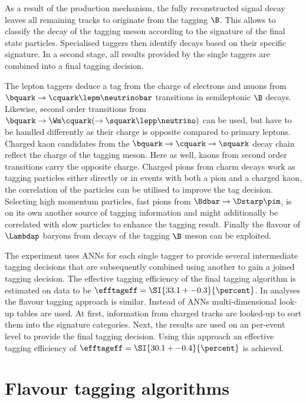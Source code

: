 As a result of the production mechanism, the fully reconstructed signal decay
leaves all remaining tracks to originate from the tagging $\B$. This allows to
classify the decay of the tagging meson according to the signature of the final
state particles. Specialised taggers then identify decays based on their
specific signature. In a second stage, all results provided by the single
taggers are combined into a final tagging decision. 

The lepton taggers deduce a tag from the charge of electrons and muons from
$\bquark \to \cquark \lepm \neutrinobar$ transitions in semileptonic $\B$
decays. Likewise, second order transitions from $\bquark \to \Wm \cquark ( \to
\squark \lepp \neutrino )$ can be used, but have to be handled differently as
their charge is opposite compared to primary leptons. Charged kaon candidates
from the $\bquark \to \cquark \to \squark$ decay chain reflect the charge of the
tagging meson. Here as well, kaons from second order transitions carry the
opposite charge. Charged pions from charm decays work as tagging particles
either directly or in events with both a pion and a charged kaon, the
correlation of the particles can be utilised to improve the tag decision.
Selecting high momentum particles, \eg fast pions from $\Bdbar \to \Dstarp
\pim$, is on its own another source of tagging information and might
additionally be correlated with slow particles to enhance the tagging result.
Finally the flavour of $\Lambdap$ baryons from decays of the tagging $\B$ meson
can be exploited.

The \Babar experiment uses \acp{ANN} for each single tagger to provide several
intermediate tagging decisions that are subsequently combined using another \ANN
to gain a joined tagging decision. The effective tagging efficiency of the final
\Babar tagging algorithm is estimated on data to be $\efftageff = \SI{33.1 +-
0.3}{\percent}$. In \Belle analyses the flavour tagging approach is similar.
Instead of \acp{ANN} multi-dimensional look-up tables are used. At first,
information from charged tracks are looked-up to sort them into the signature
categories. Next, the results are used on an per-event level to provide the
final tagging decision. Using this approach an effective tagging efficiency of
$\efftageff = \SI{30.1 +- 0.4}{\percent}$ is achieved.

\section{Flavour tagging algorithms}
\label{sec:flavour_tagging:lhcb}

